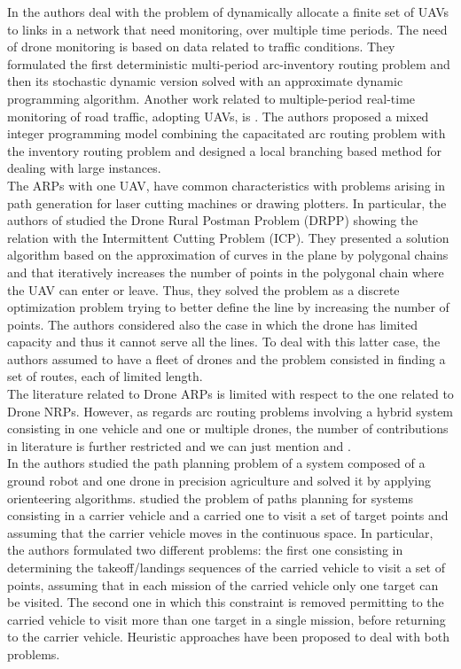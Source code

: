 In \cite{art:Chow2016} the authors deal with the problem of dynamically allocate a finite set of UAVs to links in a network that need monitoring, over multiple time periods. The need of drone monitoring is based on data related to traffic conditions. They formulated the first deterministic multi-period arc-inventory routing problem and then its stochastic dynamic version solved with an approximate dynamic programming algorithm. 
Another work related to multiple-period real-time monitoring of road traffic, adopting UAVs, is \cite{art:Li2018}. The authors proposed a mixed integer programming model combining the capacitated arc routing problem with the inventory routing problem and designed a local branching based method for dealing with large instances.\\
The ARPs with one UAV, have common characteristics with problems arising in path generation for laser cutting machines or drawing plotters. In particular, the authors of \cite{art:Campbell2018} studied the Drone Rural Postman Problem (DRPP) showing the relation with the Intermittent Cutting Problem (ICP). They presented a solution algorithm based on the approximation of curves in the plane by polygonal chains and that iteratively increases the number of points in the polygonal chain where the UAV can enter or leave. Thus, they solved the problem as a discrete optimization problem trying to better define the line by increasing the number of points. The authors considered also the case in which the drone has limited capacity and thus it cannot serve all the lines. To deal with this latter case, the authors assumed to have a fleet of drones and the problem consisted in finding a set of routes, each of limited length.\\
The literature related to Drone ARPs is limited with respect to the one related to Drone NRPs.
However, as regards arc routing problems involving a hybrid system consisting in one vehicle and one or multiple drones, the number of contributions in literature is further restricted and we can just mention \cite{art:Tokekar2016} and \cite{art:Garone2010}.\\
In \cite{art:Tokekar2016} the authors studied the path planning problem of a system composed of a ground robot and one drone in precision agriculture and solved it by applying orienteering algorithms. \cite{art:Garone2010} studied the problem of paths planning for systems consisting in a carrier vehicle and a carried one to visit a set of target points and assuming that the carrier vehicle moves in the continuous space. In particular, the authors formulated two different problems: the first one consisting in determining the takeoff/landings sequences of the carried vehicle to visit a set of points, assuming that in each mission of the carried vehicle only one target can be visited. The second one in which this constraint is removed permitting to the carried vehicle to visit more than one target in a single mission, before returning to the carrier vehicle. Heuristic approaches have been proposed to deal with both problems.\\
